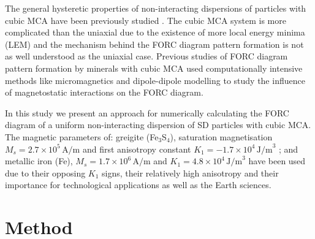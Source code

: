The general hysteretic properties of non-interacting dispersions of particles with cubic MCA have been previously studied \citep{Usov1997,Walker1993}. The cubic MCA system is more complicated than the uniaxial due to the existence of more local energy minima (LEM) and the mechanism behind the FORC diagram pattern formation is not as well understood as the uniaxial case. Previous studies of FORC diagram pattern formation by minerals with cubic MCA used computationally intensive methods like micromagnetics \citep{Muxworthy2004} and dipole-dipole modelling \citep{Harrison2014} to study the influence of magnetostatic interactions on the FORC diagram.\par
In this study we present an approach for numerically calculating the FORC diagram of a uniform non-interacting dispersion of SD particles with cubic MCA. The magnetic parameters of: greigite (Fe$_3$S$_4$), saturation magnetisation $M_s=2.7\times 10^5 \, \text{A/m}$ \citep{Li2014} and first anisotropy constant $K_1=-1.7\times 10^4 \, \text{J/m}^3$ \citep{Winklhofer2014}; and metallic iron (Fe), $M_s=1.7\times 10^6 \, \text{A/m}$ \citep{Dunlop} and $K_1=4.8\times 10^4 \, \text{J/m}^3$ \citep{Graham1958} have been used due to their opposing $K_1$ signs, their relatively high anisotropy and their importance for technological applications as well as the Earth sciences.\par

\section{Method}
